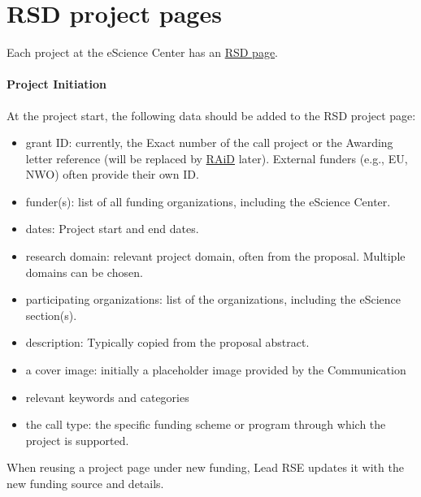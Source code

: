 \section{RSD project pages}
\label{app:rsd-page}

Each project at the eScience Center has an \href{https://research-software-directory.org/organisations/netherlands-escience-center?tab=projects}{RSD page}. 
\paragraph{Project Initiation} At the project start, the following data should be added to the RSD project page:
\begin{itemize}
   \item grant ID: currently, the Exact number of the call project or the Awarding letter reference (will be replaced by \href{https://raid.org/}{RAiD} later).
        External funders (e.g., EU, NWO) often provide their own ID.
   \item funder(s): list of all funding organizations, including the eScience Center.
   \item dates: Project start and end dates.
   \item research domain: relevant project domain, often from the proposal. Multiple domains can be chosen.
   \item participating organizations: list of the organizations, including the eScience section(s).
   \item description: Typically copied from the proposal abstract.
   \item a cover image: initially a placeholder image provided by the Communication
   \item relevant keywords and categories
   \item the call type: the specific funding scheme or program through which the project is supported.
 \end{itemize}
 When reusing a project page under new funding, Lead RSE updates it with the new funding source and details.

